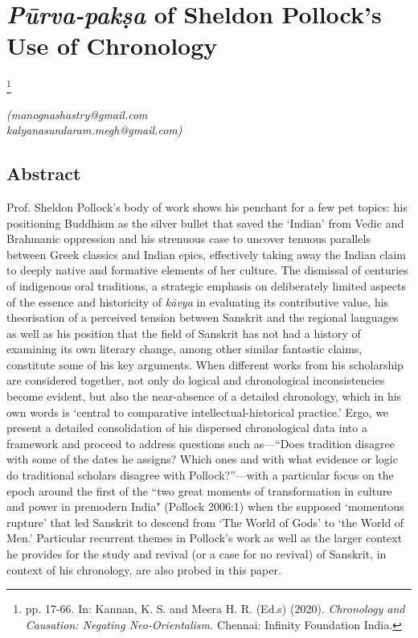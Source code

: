 
\chapter{\textit{Pūrva-pakṣa} of Sheldon Pollock's Use of Chronology}\label{chapter1}


\footnote{pp. 17-66. In: Kannan, K. S. and Meera H. R. (Ed.s) (2020). \textit{Chronology and Causation: Negating Neo-Orientalism.} Chennai: Infinity Foundation India.}


\begin{flushright}
\textit{(manognashastry@gmail.com}\\\textit{kalyanasundaram.megh@gmail.com)}
\end{flushright}


\section*{Abstract}

Prof. Sheldon Pollock’s body of work shows his penchant for a few pet topics: his positioning Buddhism as the silver bullet that saved the ‘Indian’ from Vedic and Brahmanic oppression and his strenuous case to uncover tenuous parallels between Greek classics and Indian epics, effectively taking away the Indian claim to deeply native and formative elements of her culture. The dismissal of centuries of indigenous oral traditions, a strategic emphasis on deliberately limited aspects of the essence and historicity of  \textit{kāvya} in evaluating its contributive value, his theorisation of a perceived tension between Sanskrit and the regional languages as well as his position that the field of Sanskrit has not had a history of examining its own literary change, among other similar fantastic claims, constitute some of his key arguments. When different works from his scholarship are considered together, not only do logical and chronological inconsistencies become evident, but also the near-absence of a detailed chronology, which in his own words is ‘central to comparative intellectual-historical practice.’ Ergo, we present a detailed consolidation of his dispersed chronological data into a framework and proceed to address questions such as—“Does tradition disagree with some of the dates he assigns? Which ones and with what evidence or logic do traditional scholars disagree with Pollock?”—with a particular focus on the epoch around the first of the ``two great moments of transformation in culture and power in premodern India" (Pollock 2006:1) when the supposed ‘momentous rupture’ that led Sanskrit to descend from ‘The World of Gods’ to ‘the World of Men.’ Particular recurrent themes in Pollock’s work as well as the larger context he provides for the study and revival (or a case for no revival) of Sanskrit, in context of his chronology, are also probed in this paper.




